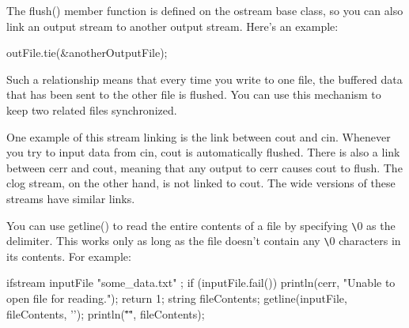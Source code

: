 The flush() member function is defined on the ostream base class, so you can also link an output stream to another output stream. Here’s an example:

\begin{cpp}
outFile.tie(&anotherOutputFile);
\end{cpp}

Such a relationship means that every time you write to one file, the buffered data that has been sent to the other file is flushed. You can use this mechanism to keep two related files synchronized.

One example of this stream linking is the link between cout and cin. Whenever you try to input data from cin, cout is automatically flushed. There is also a link between cerr and cout, meaning that any output to cerr causes cout to flush. The clog stream, on the other hand, is not linked to cout. The wide versions of these streams have similar links.


You can use getline() to read the entire contents of a file by specifying \verb|\|0 as the delimiter. This works only as long as the file doesn’t contain any \verb|\|0 characters in its contents. For example:

\begin{cpp}
ifstream inputFile { "some_data.txt" };
if (inputFile.fail()) {
    println(cerr, "Unable to open file for reading.");
    return 1;
}
string fileContents;
getline(inputFile, fileContents, '\0');
println("\"{}\"", fileContents);
\end{cpp}














